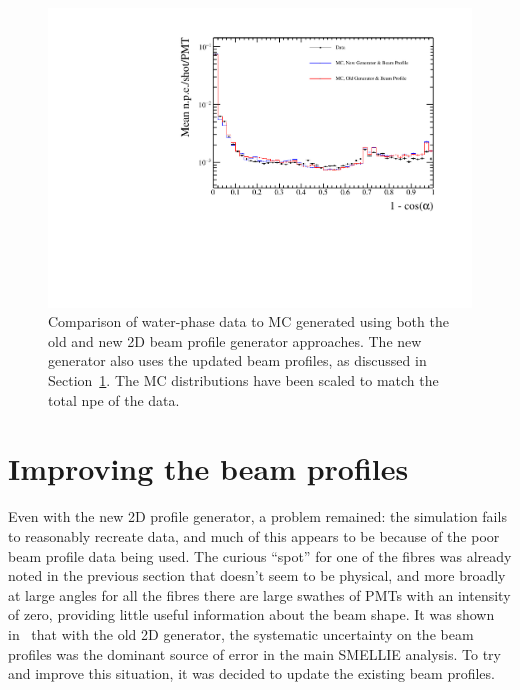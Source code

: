 \begin{figure}
    \centering
    \includegraphics[width=0.8\linewidth]{4_SMELLIESimulation/images/data_mc_comparison_npe_vs_r_114018_109_use_f_and_old.pdf}
    \caption[Comparison of water-phase data to MC generated using both the old and new 2D beam profile generator approaches]
    {Comparison of water-phase data to MC generated using both the old and new 2D beam profile generator approaches. The new generator also uses the updated beam profiles, as discussed in Section~\ref{sect:new_beam_profiles}. The MC distributions have been scaled to match the total npe of the data.}
    \label{fig:data_generator_comp_new_profiles}
\end{figure}

\section{Improving the beam profiles}\label{sect:new_beam_profiles}
Even with the new 2D profile generator, a problem remained: the simulation fails to reasonably recreate data, and much of this appears to be because of the poor beam profile data being used. The curious ``spot'' for one of the fibres was already noted in the previous section that doesn't seem to be physical, and more broadly at large angles for all the fibres there are large swathes of PMTs with an intensity of zero, providing little useful information about the beam shape. It was shown in~\cite{turnerMeasurementScatteringCharacteristics2022} that with the old 2D generator, the systematic uncertainty on the beam profiles was the dominant source of error in the main SMELLIE analysis. To try and improve this situation, it was decided to update the existing beam profiles.

